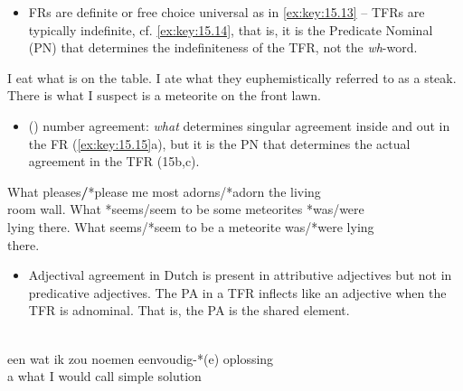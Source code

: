 \documentclass[output=paper]{langsci/langscibook}
\begin{document}
\begin{refcontext}
\begin{itemize}
    \item 	 \glspl{FR} are definite or free choice universal as in \eqref{ex:key:15.13} –
        \glspl{TFR} are typically indefinite, cf. \eqref{ex:key:15.14}, that is, it is the
        Predicate Nominal (PN) that determines the indefiniteness of the
        \gls{TFR}, not the \emph{wh}{}-word.

\end{itemize}

\ea\label{ex:key:15.13}
    I eat what is on the table.
\z
\ea\label{ex:key:15.14}
    \ea I ate what they euphemistically referred to as a steak.
    \ex There is what I suspect is a meteorite on the front lawn.
    \z
\z

\begin{itemize}

    \item 	 () number agreement: \emph{what} determines singular
        agreement inside and out in the \gls{FR} (\ref{ex:key:15.15}a), but it is the \gls{PN}
        that determines the actual agreement in the \gls{TFR} (15b,c).

\end{itemize}

\ea\label{ex:key:15.15}
    \ea What pleases\textbf{/}*please me most adorns/*adorn the living\\ room wall.
    \ex What *seems/seem to be some meteorites *was/were \\ lying there.
    \ex What seems/*seem to be a meteorite was/*were lying\\ there.
    \z
\z

\begin{itemize}

    \item Adjectival agreement in Dutch is present in attributive adjectives
        but not in predicative adjectives. The \gls{PA} in a
        \gls{TFR} inflects like an adjective when the \gls{TFR} is adnominal.
        That is, the \gls{PA} is the shared element.

\end{itemize}

\ea\label{ex:key:15.16}\\
    \gll    een  wat    ik zou     noemen eenvoudig-*(e) oplossing  \\
            a      what  I  would call        simple               solution\\
    \glt
\z

\begin{itemize}


\end{itemize}
\end{refcontext}
\end{document}
